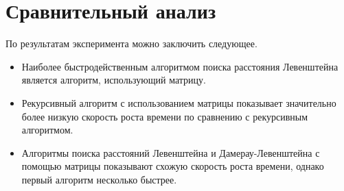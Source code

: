 \section*{Сравнительный анализ}
По результатам эксперимента можно заключить следующее.
\begin{itemize}
	\item Наиболее быстродейственным алгоритмом поиска расстояния Левенштейна является алгоритм, использующий матрицу.
	\item Рекурсивный алгоритм с использованием матрицы показывает значительно более низкую скорость роста времени по сравнению с рекурсивным алгоритмом.
	\item Алгоритмы поиска расстояний Левенштейна и Дамерау-Левенштейна с помощью матрицы показывают схожую скорость роста времени, однако первый алгоритм несколько быстрее.
\end{itemize}


	